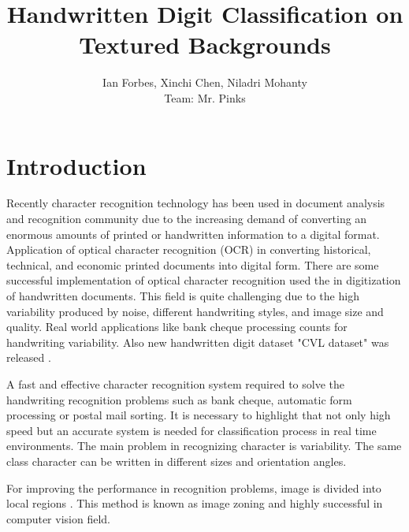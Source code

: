 \documentclass[10pt,twocolumn]{article}
\title{Handwritten Digit Classification on Textured Backgrounds}
\author{Ian Forbes, Xinchi Chen, Niladri Mohanty\\ Team: Mr. Pinks}
\begin{document}
\section{Introduction}
Recently character recognition technology has been used in document analysis and recognition community due to the increasing demand of converting an enormous amounts of printed or handwritten information to a digital format. Application of optical character recognition (OCR) in converting historical, technical, and economic printed documents into digital form. There are some successful implementation of optical character recognition used the in digitization of handwritten documents. This field is quite challenging due to the high variability produced by noise, different handwriting styles, and image size and quality. Real world applications like bank cheque processing counts for handwriting variability\cite {diem2013icdar}. Also new handwritten digit dataset "CVL dataset" was released \cite {liu2003handwritten}. 

A fast and effective character recognition system required to solve the handwriting recognition problems such as bank cheque, automatic form processing or postal mail sorting. It is necessary to highlight that not only high speed but an accurate system is needed for classification process in real time environments. The main problem in recognizing character is variability. The same class character can be written in different sizes and orientation angles.

For improving the performance in recognition problems, image is divided into local regions \cite {lazebnik2006beyond}. This method is known as image zoning and highly successful in computer vision field\cite {ciresan2012multi}.
\end{document}
